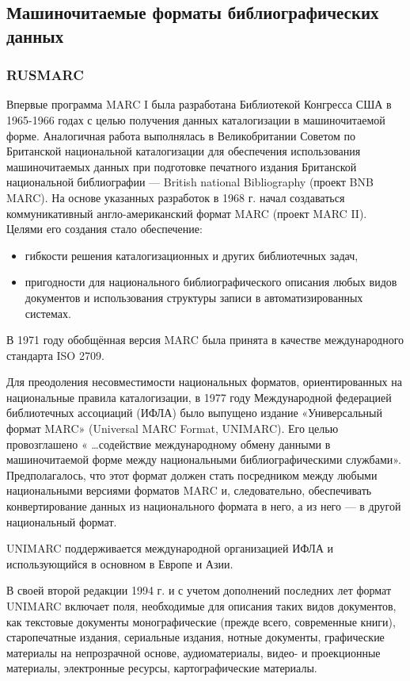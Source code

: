 \subsection{Машиночитаемые форматы библиографических данных}



\subsubsection{RUSMARC}

Впервые программа MARC I была разработана Библиотекой Конгресса США в 1965-1966 годах с целью получения данных каталогизации в машиночитаемой форме. Аналогичная работа выполнялась в Великобритании Советом по Британской национальной каталогизации для обеспечения использования машиночитаемых данных при подготовке печатного издания Британской национальной библиографии — British national Bibliography (проект BNB MARC). На основе указанных разработок в 1968 г. начал создаваться коммуникативный англо-американский формат MARC (проект MARC II). Целями его создания стало обеспечение:

\begin{itemize}
	\item гибкости решения каталогизационных и других библиотечных задач,
	\item пригодности для национального библиографического описания любых видов документов и использования структуры записи в автоматизированных системах.
\end{itemize}

В 1971 году обобщённая версия MARC была принята в качестве международного стандарта ISO 2709.

Для преодоления несовместимости национальных форматов, ориентированных на национальные правила каталогизации, в 1977 году Международной федерацией библиотечных ассоциаций (ИФЛА) было выпущено издание «Универсальный формат MARC» (Universal MARC Format, UNIMARC). Его целью провозглашено « …содействие международному обмену данными в машиночитаемой форме между национальными библиографическими службами». Предполагалось, что этот формат должен стать посредником между любыми национальными версиями форматов MARC и, следовательно, обеспечивать конвертирование данных из национального формата в него, а из него — в другой национальный формат.

UNIMARC поддерживается международной организацией ИФЛА и использующийся в основном в Европе и Азии.

В своей второй редакции 1994 г. и с учетом дополнений последних лет формат UNIMARC включает поля, необходимые для описания таких видов документов, как текстовые документы монографические (прежде всего, современные книги), старопечатные издания, сериальные издания, нотные документы, графические материалы на непрозрачной основе, аудиоматериалы, видео- и проекционные материалы, электронные ресурсы, картографические материалы.

